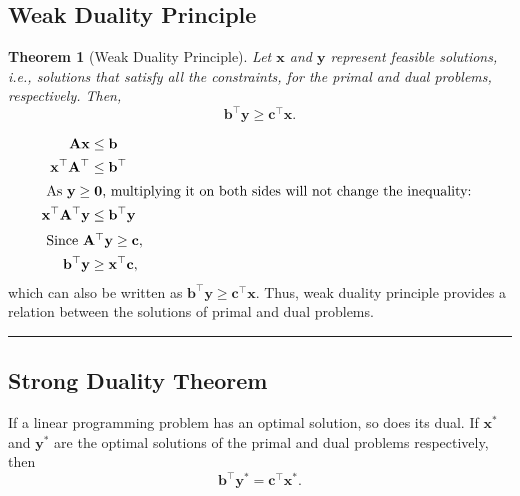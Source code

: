 \documentclass[twoside]{article}
\newcounter{lecnum}
\newtheorem{theorem}{Theorem}[lecnum]
\newenvironment{proof}{{\textit{Proof.}}}{\hfill\rule{2mm}{2mm}}
\begin{document}
\subsection{Weak Duality Principle}

\begin{theorem}[Weak Duality Principle]
    Let $\mathbf{x}$ and $\mathbf{y}$ represent feasible solutions, i.e., solutions
    that satisfy all the constraints, for the primal and dual problems,
    respectively. Then, \[
        \mathbf{b}^\top \mathbf{y} \ge \mathbf{c}^\top \mathbf{x}.
    \]
\end{theorem}
\begin{proof}
    \begin{align}
        \mathbf{Ax} &\leq \mathbf{b} \\
        \mathbf{x}^\top \mathbf{A}^\top &\leq \mathbf{b}^\top \\
        \intertext{
            As $\mathbf{y} \geq \mathbf{0}$, multiplying it on both sides will not
            change the inequality:
        }
        \mathbf{x}^\top \mathbf{A}^\top \mathbf{y}
                                        &\leq \mathbf{b}^\top \mathbf{y} \\
        \intertext{
            Since $\mathbf{A}^\top \mathbf{y} \geq \mathbf{c},$
        }
        \mathbf{b}^\top \mathbf{y} &\geq \mathbf{x}^\top \mathbf{c},
    \end{align}
    which can also be written as $\mathbf{b}^\top \mathbf{y} \geq
    \mathbf{c}^\top \mathbf{x}$.
    Thus, weak duality principle provides a relation between the
    solutions of primal and dual problems.
\end{proof}

\subsection{Strong Duality Theorem}
If a linear programming problem has an optimal solution, so does its dual. If
$\mathbf{x^*}$ and $\mathbf{y^*}$ are the optimal solutions of the primal and
dual problems respectively, then \[
    \mathbf{b}^\top \mathbf{y}^* = \mathbf{c}^\top \mathbf{x}^*.
\]
\end{document}
